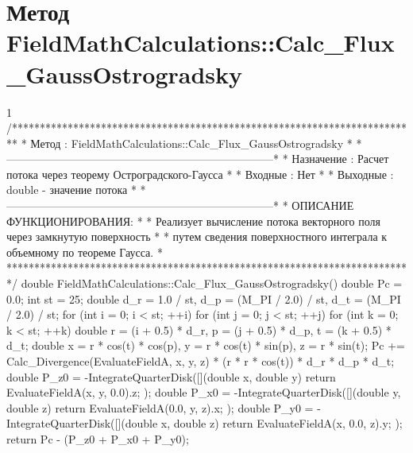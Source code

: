 \section{Метод FieldMathCalculations::Calc\_Flux\_GaussOstrogradsky}
\footnotesize
\begin{listing}{1}
/*************************************************************************
* Метод         : FieldMathCalculations::Calc_Flux_GaussOstrogradsky     *
*------------------------------------------------------------------------*
* Назначение    : Расчет потока через теорему Остроградского-Гаусса      *
* Входные       : Нет                                                    *
* Выходные      : double - значение потока                               *
*------------------------------------------------------------------------*
* ОПИСАНИЕ ФУНКЦИОНИРОВАНИЯ:                                             *
* Реализует вычисление потока векторного поля через замкнутую поверхность *
* путем сведения поверхностного интеграла к объемному по теореме Гаусса. *
*************************************************************************/
double FieldMathCalculations::Calc_Flux_GaussOstrogradsky() {
    double Pc = 0.0; int st = 25;
    double d_r = 1.0 / st, d_p = (M_PI / 2.0) / st, d_t = (M_PI / 2.0) / st;
    for (int i = 0; i < st; ++i) {
        for (int j = 0; j < st; ++j) {
            for (int k = 0; k < st; ++k) {
                double r = (i + 0.5) * d_r, p = (j + 0.5) * d_p, t = (k + 0.5) * d_t;
                double x = r * cos(t) * cos(p), y = r * cos(t) * sin(p), z = r * sin(t);
                Pc += Calc_Divergence(EvaluateFieldA, x, y, z) 
	      	* (r * r * cos(t)) * d_r * d_p * d_t;
            }
        }
    }
    double P_z0 = -IntegrateQuarterDisk([](double x, double y) { 
        return EvaluateFieldA(x, y, 0.0).z; });
    double P_x0 = -IntegrateQuarterDisk([](double y, double z) { 
        return EvaluateFieldA(0.0, y, z).x; });
    double P_y0 = -IntegrateQuarterDisk([](double x, double z) { 
        return EvaluateFieldA(x, 0.0, z).y; });
    return Pc - (P_z0 + P_x0 + P_y0);
}
\end{listing}
\normalsize

\pagebreak

